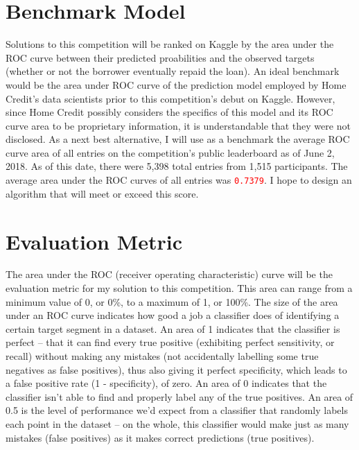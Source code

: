\documentclass[12pt, letterpaper]{article}
\begin{document}
\section{Benchmark Model}
Solutions to this competition will be ranked on Kaggle by the area under the ROC curve between their predicted proabilities and the observed targets (whether or not the borrower eventually repaid the loan). An ideal benchmark would be the area under ROC curve of the prediction model employed by Home Credit's data scientists prior to this competition's debut on Kaggle. However, since Home Credit possibly considers the specifics of this model and its ROC curve area to be proprietary information, it is understandable that they were not disclosed. As a next best alternative, I will use as a benchmark the average ROC curve area of all entries on the competition's public leaderboard\cite{kagglehomecreditcompetitionpublicleaderboard} as of June 2, 2018. As of this date, there were 5,398 total entries from 1,515 participants. The average area under the ROC curves of all entries was \colorbox{backcolor}{\textcolor{red}{\texttt{0.7379}}}. I hope to design an algorithm that will meet or exceed this score.

\section{Evaluation Metric}
The area under the ROC (receiver operating characteristic) curve will be the evaluation metric for my solution to this competition. This area can range from a minimum value of 0, or 0\%, to a maximum of 1, or 100\%. The size of the area under an ROC curve indicates how good a job a classifier does of identifying a certain target segment in a dataset. An area of 1 indicates that the classifier is perfect -- that it can find every true positive (exhibiting perfect sensitivity, or recall) without making any mistakes (not accidentally labelling some true negatives as false positives), thus also giving it perfect specificity, which leads to a false positive rate (1 - specificity), of zero. An area of 0 indicates that the classifier isn't able to find and properly label any of the true positives. An area of 0.5 is the level of performance we'd expect from a classifier that randomly labels each point in the dataset -- on the whole, this classifier would make just as many mistakes (false positives) as it makes correct predictions (true positives).
\end{document}
